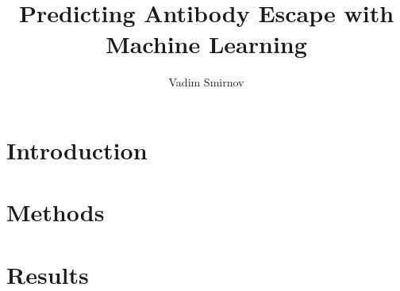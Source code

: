 \documentclass{CUP-JNL-DTM}%
\theoremstyle{definition}
\numberwithin{equation}{section}
\begin{document}
\begin{Frontmatter}

\title[Article Title]{Predicting Antibody Escape with Machine Learning}

\author[1]{Vadim Smirnov}%


\address[1]{, , }

\end{Frontmatter}

\localtableofcontents

\section[Introduction]{Introduction}

\section[Methods]{Methods}

\section[Results]{Results}

\begin{Backmatter}

\begin{thebibliography}{}

\end{thebibliography}

\end{Backmatter}
\end{document}

